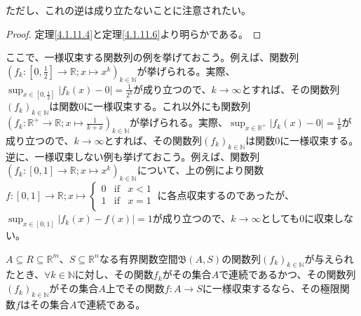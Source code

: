 \documentclass[dvipdfmx]{jsarticle}
\begin{document}
ただし、これの逆は成り立たないことに注意されたい。
\begin{proof} 定理\ref{4.1.11.4}と定理\ref{4.1.11.6}より明らかである。
\end{proof}\par
ここで、一様収束する関数列の例を挙げておこう。例えば、関数列$\left( f_{k}:\left[ 0,\frac{1}{2} \right] \rightarrow \mathbb{R};x \mapsto x^{k} \right)_{k \in \mathbb{N}}$が挙げられる。実際、$\sup_{x \in \left[ 0,\frac{1}{2} \right]}\left| f_{k}(x) - 0 \right| = \frac{1}{2^{k}}$が成り立つので、$k \rightarrow \infty$とすれば、その関数列$\left( f_{k} \right)_{k \in \mathbb{N}}$は関数$0$に一様収束する。これ以外にも関数列$\left( f_{k}:\mathbb{R}^{+} \rightarrow \mathbb{R};x \mapsto \frac{1}{k + x} \right)_{k \in \mathbb{N}}$が挙げられる。実際、$\sup_{x \in \mathbb{R}^{+}}\left| f_{k}(x) - 0 \right| = \frac{1}{k}$が成り立つので、$k \rightarrow \infty$とすれば、その関数列$\left( f_{k} \right)_{k \in \mathbb{N}}$は関数$0$に一様収束する。逆に、一様収束しない例も挙げておこう。例えば、関数列$\left( f_{k}:[ 0,1] \rightarrow \mathbb{R};x \mapsto x^{k} \right)_{k \in \mathbb{N}}$について、上の例により関数$f:[ 0,1] \rightarrow \mathbb{R};x \mapsto \left\{ \begin{matrix}
0 & \mathrm{if} & x < 1 \\
1 & \mathrm{if} & x = 1 \\
\end{matrix} \right.\ $に各点収束するのであったが、$\sup_{x \in [ 0,1]}\left| f_{k}(x) - f(x) \right| = 1$が成り立つので、$k \rightarrow \infty$としても$0$に収束しない。
\begin{thm}\label{4.1.11.8}
$A \subseteq R \subseteq \mathbb{R}^{m}$、$S \subseteq \mathbb{R}^{n}$なる有界関数空間$\mathfrak{B}(A,S)$の関数列$\left( f_{k} \right)_{k \in \mathbb{N}}$が与えられたとき、$\forall k \in \mathbb{N}$に対し、その関数$f_{k}$がその集合$A$で連続であるかつ、その関数列$\left( f_{k} \right)_{k \in \mathbb{N}}$がその集合$A$上でその関数$f:A \rightarrow S$に一様収束するなら、その極限関数$f$はその集合$A$で連続である。
\end{thm}
\end{document}
